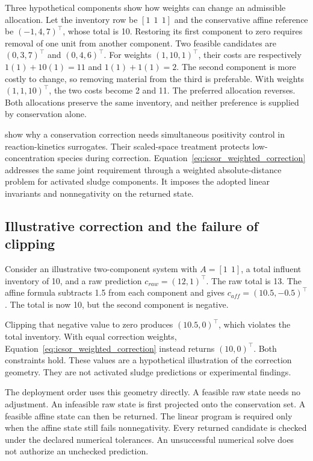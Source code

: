 Three hypothetical components show how weights can change an admissible allocation. Let the inventory row be \([1\ \ 1\ \ 1]\) and the conservative affine reference be \((-1,4,7)^\top\), whose total is 10. Restoring its first component to zero requires removal of one unit from another component. Two feasible candidates are \((0,3,7)^\top\) and \((0,4,6)^\top\). For weights \((1,10,1)^\top\), their costs are respectively \(1(1)+10(1)=11\) and \(1(1)+1(1)=2\). The second component is more costly to change, so removing material from the third is preferable. With weights \((1,1,10)^\top\), the two costs become 2 and 11. The preferred allocation reverses. Both allocations preserve the same inventory, and neither preference is supplied by conservation alone.

\citet{KircherVotsmeier2025} show why a conservation correction needs simultaneous positivity control in reaction-kinetics surrogates. Their scaled-space treatment protects low-concentration species during correction. Equation~\eqref{eq:icsor_weighted_correction} addresses the same joint requirement through a weighted absolute-distance problem for activated sludge components. It imposes the adopted linear invariants and nonnegativity on the returned state.

\subsection{Illustrative correction and the failure of clipping}

Consider an illustrative two-component system with \(A=[1\ \ 1]\), a total influent inventory of 10, and a raw prediction \(c_{raw}=(12,1)^\top\). The raw total is 13. The affine formula subtracts 1.5 from each component and gives \(c_{aff}=(10.5,-0.5)^\top\). The total is now 10, but the second component is negative.

Clipping that negative value to zero produces \((10.5,0)^\top\), which violates the total inventory. With equal correction weights, Equation~\eqref{eq:icsor_weighted_correction} instead returns \((10,0)^\top\). Both constraints hold. These values are a hypothetical illustration of the correction geometry. They are not activated sludge predictions or experimental findings.

The deployment order uses this geometry directly. A feasible raw state needs no adjustment. An infeasible raw state is first projected onto the conservation set. A feasible affine state can then be returned. The linear program is required only when the affine state still fails nonnegativity. Every returned candidate is checked under the declared numerical tolerances. An unsuccessful numerical solve does not authorize an unchecked prediction.

